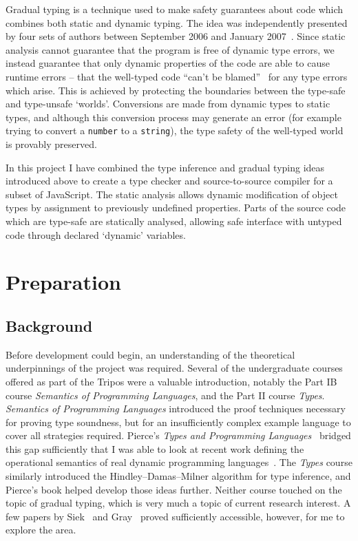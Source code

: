 \documentclass[12pt,a4paper,twoside,openright]{report}
\begin{document}
Gradual typing is a technique used to make safety guarantees about code which
combines both static and dynamic typing. The idea was independently presented
by four sets of authors between September 2006 and January 2007~\cite{gradSiek,
gradTobin, gradMatthews, gradGronski}. Since static analysis cannot guarantee
that the program is free of dynamic type errors, we instead guarantee that only
dynamic properties of the code are able to cause runtime errors -- that the
well-typed code ``can't be blamed''~\cite{cantblame} for any type errors which
arise. This is achieved by protecting the boundaries between the type-safe and
type-unsafe `worlds'. Conversions are made from dynamic types to static types,
and although this conversion process may generate an error (for example trying
to convert a \texttt{number} to a \texttt{string}), the type safety of the
well-typed world is provably preserved.

In this project I have combined the type inference and gradual typing ideas
introduced above to create a type checker and source-to-source compiler for a
subset of JavaScript. The static analysis allows dynamic modification of
object types by assignment to previously undefined properties. Parts of the
source code which are type-safe are statically analysed, allowing safe
interface with untyped code through declared `dynamic' variables.

\chapter{Preparation}\label{preparation} \section{Background}
Before development could begin, an understanding of the theoretical
underpinnings of the project was required. Several of the undergraduate courses
offered as part of the Tripos were a valuable introduction, notably the Part IB
course \textit{Semantics of Programming Languages}, and the Part II course
\textit{Types}. \textit{Semantics of Programming Languages} introduced the
proof techniques necessary for proving type soundness, but for an
insufficiently complex example language to cover all strategies required.
Pierce's \textit{Types and Programming Languages}~\cite{pierce} bridged this
gap sufficiently that I was able to look at recent work defining the
operational semantics of real dynamic programming languages~\cite{pythonOpSem}.
The \textit{Types} course similarly introduced the Hindley--Damas--Milner
algorithm for type inference, and Pierce's book helped develop those ideas
further. Neither course touched on the topic of gradual typing, which is very
much a topic of current research interest. A few papers by Siek~\cite{gradSiek,
gradSiek2} and Gray~\cite{gradGray} proved sufficiently accessible, however,
for me to explore the area.
\end{document}
